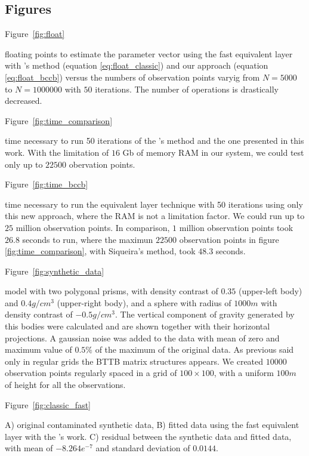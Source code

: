 \documentclass[paper]{geophysics}
\begin{document}
\subsection*{Figures}
\renewcommand{\figdir}{Fig} %

Figure~\ref{fig:float}

{floating points to estimate the parameter vector using the fast equivalent layer with \cite{siqueira2017fast}'s method (equation \ref{eq:float_classic}) and our approach (equation \ref{eq:float_bccb}) versus the numbers of observation points varyig from $N = 5000$ to $N = 1000000$ with $50$ iterations. The number of operations is drastically decreased.}
\newpage

Figure~\ref{fig:time_comparison}

{time necessary to run 50 iterations of the \cite{siqueira2017fast}'s method and the one presented in this work. With the limitation of $16$ Gb of memory RAM in our system, we could test only up to $22500$ obervation points.}

Figure~\ref{fig:time_bccb}

{time necessary to run the equivalent layer technique with 50 iterations using only this new approach, where the RAM is not a limitation factor. We could run up to $25$ million observation points. In comparison, $1$ million observation points took $26.8$ seconds to run, where the maximun $22500$ observation points in figure \ref{fig:time_comparison}, with Siqueira's method, took $48.3$ seconds.}
\newpage

Figure~\ref{fig:synthetic_data}

{model with two polygonal prisms, with density contrast of $0.35$ (upper-left body) and $0.4 g/cm^3$ (upper-right body), and a sphere with radius of $1000 m$ with density contrast of $-0.5 g/cm^3$. The vertical component of gravity generated by this bodies were calculated and are shown together with their horizontal projections. A gaussian noise was added to the data with mean of zero and maximum value of $0.5\%$ of the maximum of the original data. As previous said only in regular grids the BTTB matrix structures appears. We created $10000$ observation points regularly spaced in a grid of $100 \times 100$, with a uniform $100 m$ of height for all the observations.}
\newpage

Figure~\ref{fig:classic_fast}

{A) original contaminated synthetic data, B) fitted data using the fast equivalent layer with the \cite{siqueira2017fast}'s work. C) residual between the synthetic data and fitted data, with mean of $-8.264e^{-7}$ and standard deviation of $0.0144$.}
\newpage
\end{document}
